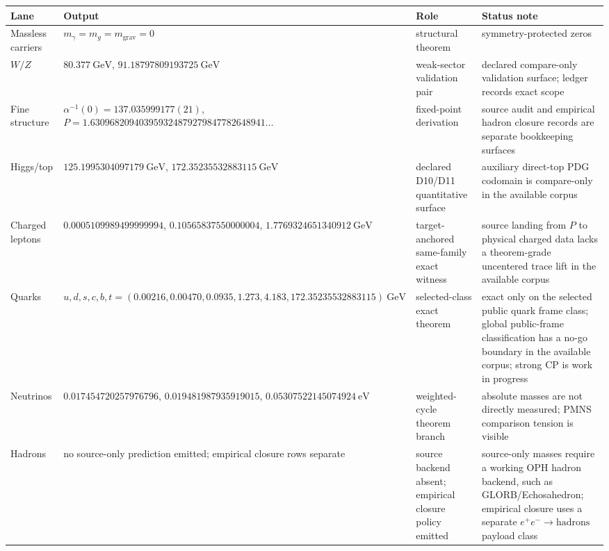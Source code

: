 \documentclass[11pt]{article}
\begin{document}
\begin{table}[h]
\centering
\scriptsize
\setlength{\tabcolsep}{3pt}
\begin{tabular}{@{}>{\raggedright\arraybackslash}p{}>{\raggedright\arraybackslash}p{}>{\raggedright\arraybackslash}p{}>{\raggedright\arraybackslash}p{}@{}}
\toprule
Lane & Output & Role & Status note \\
\midrule
Massless carriers & \(m_\gamma=m_g=m_{\mathrm{grav}}=0\) & structural theorem & symmetry-protected zeros \\
\(W/Z\) & \(80.377~\mathrm{GeV}\), \(91.18797809193725~\mathrm{GeV}\) & weak-sector validation pair & declared compare-only validation surface; ledger records exact scope \\
Fine structure & \(\alpha^{-1}(0)=137.035999177(21)\), \(P=1.630968209403959324879279847782648941\ldots\) & fixed-point derivation & source audit and empirical hadron closure records are separate bookkeeping surfaces \\
Higgs/top & \(125.1995304097179~\mathrm{GeV}\), \(172.35235532883115~\mathrm{GeV}\) & declared D10/D11 quantitative surface & auxiliary direct-top PDG codomain is compare-only in the available corpus \\
Charged leptons & \(0.0005109989499999994\), \(0.10565837550000004\), \(1.7769324651340912~\mathrm{GeV}\) & target-anchored same-family exact witness & source landing from \(P\) to physical charged data lacks a theorem-grade uncentered trace lift in the available corpus \\
Quarks & \(u,d,s,c,b,t=(0.00216,0.00470,0.0935,1.273,4.183,172.35235532883115)~\mathrm{GeV}\) & selected-class exact theorem & exact only on the selected public quark frame class; global public-frame classification has a no-go boundary in the available corpus; strong CP is work in progress \\
Neutrinos & \(0.017454720257976796\), \(0.019481987935919015\), \(0.05307522145074924~\mathrm{eV}\) & weighted-cycle theorem branch & absolute masses are not directly measured; PMNS comparison tension is visible \\
Hadrons & no source-only prediction emitted; empirical closure rows separate & source backend absent; empirical closure policy emitted & source-only masses require a working OPH hadron backend, such as GLORB/Echosahedron; empirical closure uses a separate \(e^+e^-\to\mathrm{hadrons}\) payload class \\
\bottomrule
\end{tabular}
\end{table}
\end{document}
